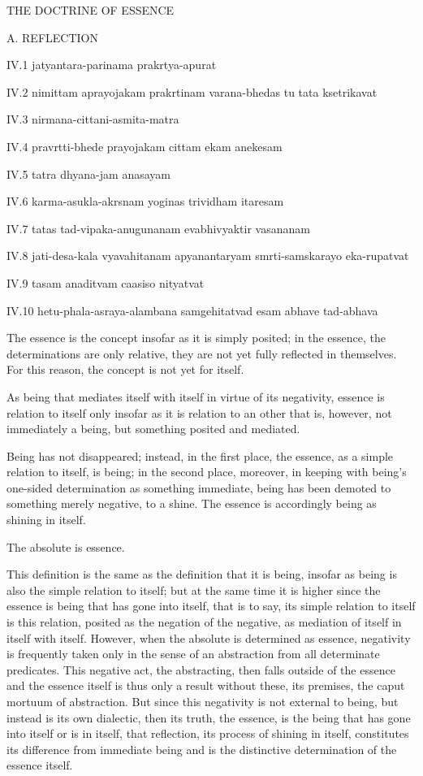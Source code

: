 THE DOCTRINE OF ESSENCE

A. REFLECTION

IV.1
jatyantara-parinama prakrtya-apurat

IV.2
nimittam aprayojakam prakrtinam varana-bhedas tu tata ksetrikavat

IV.3
nirmana-cittani-asmita-matra

IV.4
pravrtti-bhede prayojakam cittam ekam anekesam

IV.5
tatra dhyana-jam anasayam

IV.6
karma-asukla-akrsnam yoginas trividham itaresam

IV.7
tatas tad-vipaka-anugunanam evabhivyaktir vasananam

IV.8
jati-desa-kala vyavahitanam apyanantaryam smrti-samskarayo eka-rupatvat

IV.9
tasam anaditvam caasiso nityatvat

IV.10
hetu-phala-asraya-alambana samgehitatvad esam abhave tad-abhava

The essence is the concept insofar as it is simply posited;
in the essence, the determinations are only relative,
they are not yet fully reflected in themselves.
For this reason, the concept is not yet for itself.

As being that mediates itself with itself in virtue of its negativity,
essence is relation to itself only insofar as
it is relation to an other that is, however, not immediately a being,
but something posited and mediated.

Being has not disappeared;
instead, in the first place,
the essence, as a simple relation to itself, is being;
in the second place, moreover,
in keeping with being's one-sided determination as something immediate,
being has been demoted to something merely negative, to a shine.
The essence is accordingly being as shining in itself.

    The absolute is essence.

    This definition is the same as the definition that it is being,
    insofar as being is also the simple relation to itself;
    but at the same time it is higher since the essence is
    being that has gone into itself, that is to say,
    its simple relation to itself is this relation,
    posited as the negation of the negative,
    as mediation of itself in itself with itself.
    However, when the absolute is determined as essence,
    negativity is frequently taken only in the sense of
    an abstraction from all determinate predicates.
    This negative act, the abstracting, then falls outside of the essence and
    the essence itself is thus only a result without these, its premises,
    the caput mortuum of abstraction.
    But since this negativity is not external to being,
    but instead is its own dialectic,
    then its truth, the essence,
    is the being that has gone into itself or is in itself,
    that reflection, its process of shining in itself,
    constitutes its difference from immediate being and
    is the distinctive determination of the essence itself.

